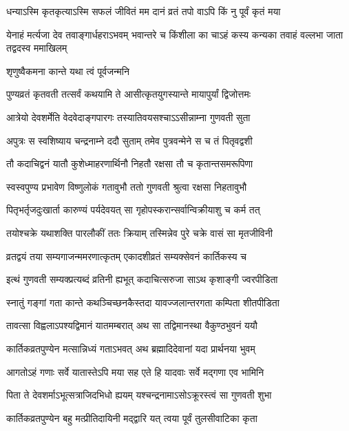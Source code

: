 \twolineshloka
{धन्याऽस्मि कृतकृत्याऽस्मि सफलं जीवितं मम}
{दानं व्रतं तपो वाऽपि किं नु पूर्वं कृतं मया} %

\threelineshloka
{येनाहं मर्त्यजा देव तवाङ्गार्धहराऽभवम्}
{भवान्तरे च किंशीला का चाऽहं कस्य कन्यका}
{तवाहं वल्लभा जाता तद्वदस्व ममाखिलम्} %



\onelineshloka
{शृणुष्वैकमना कान्ते यथा त्वं पूर्वजन्मनि} %

\twolineshloka
{पुण्यव्रतं कृतवती तत्सर्वं कथयामि ते}
{आसीत्कृतयुगस्यान्ते मायापुर्यां द्विजोत्तमः} %

\twolineshloka
{आत्रेयो देवशर्मेति वेदवेदाङ्गपारगः}
{तस्यातिवयसश्चाऽऽसीन्नाम्ना गुणवती सुता} %

\twolineshloka
{अपुत्रः स स्वशिष्याय चन्द्रनाम्ने ददौ सुताम्}
{तमेव पुत्रवन्मेने स च तं पितृवद्वशी} %

\twolineshloka
{तौ कदाचिद्वनं यातौ कुशेध्माहरणार्थिनौ}
{निहतौ रक्षसा तौ च कृतान्तसमरूपिणा} %

\twolineshloka
{स्वस्वपुण्य प्रभावेण विष्णुलोकं गतावुभौ}
{ततो गुणवती श्रुत्वा रक्षसा निहतावुभौ} %

\twolineshloka
{पितृभर्तृजदुःखार्ता कारुण्यं पर्यदेवयत्}
{सा गृहोपस्करान्सर्वान्विक्रीयाशु च कर्म तत्} %

\twolineshloka
{तयोश्चक्रे यथाशक्ति पारलौकीं ततः क्रियाम्}
{तस्मिन्नेव पुरे चक्रे वासं सा मृतजीविनी} %

\twolineshloka
{व्रतद्वयं तया सम्यगाजन्ममरणात्कृतम्}
{एकादशीव्रतं सम्यक्सेवनं कार्तिकस्य च} %

\twolineshloka
{इत्थं गुणवती सम्यक्प्रत्यब्दं व्रतिनी ह्यभूत्}
{कदाचित्सरुजा साऽथ कृशाङ्गी ज्वरपीडिता} %

\twolineshloka
{स्नातुं गङ्गां गता कान्ते कथञ्चिच्छनकैस्तदा}
{यावज्जलान्तरगता कम्पिता शीतपीडिता} %

\twolineshloka
{तावत्सा विह्वलाऽपश्यद्विमानं यातमम्बरात्}
{अथ सा तद्विमानस्था वैकुण्ठभुवनं ययौ} %

\twolineshloka
{कार्तिकव्रतपुण्येन मत्सान्निध्यं गताऽभवत्}
{अथ ब्रह्मादिदेवानां यदा प्रार्थनया भुवम्} %

\twolineshloka
{आगतोऽहं गणाः सर्वे यातास्तेऽपि मया सह}
{एते हि यादवाः सर्वे मद्गणा एव भामिनि} %

\twolineshloka
{पिता ते देवशर्माऽभूत्सत्राजिदभिधो ह्ययम्}
{यश्चन्द्रनामाऽसोऽक्रूरस्त्वं सा गुणवती शुभा} %

\twolineshloka
{कार्तिकव्रतपुण्येन बहु मत्प्रीतिदायिनी}
{मद्द्वारि यत् त्वया पूर्वं तुलसीवाटिका कृता} %

